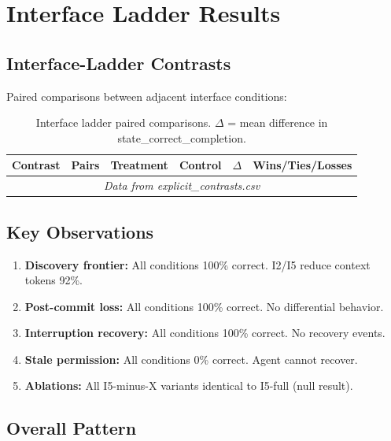 
\section{Interface Ladder Results}

\subsection{Interface-Ladder Contrasts}

Paired comparisons between adjacent interface conditions:

\begin{table}[h]
\centering
\begin{tabular}{lccccc}
\hline
\textbf{Contrast} & \textbf{Pairs} & \textbf{Treatment} & \textbf{Control} & \textbf{$\Delta$} & \textbf{Wins/Ties/Losses} \\
\hline
\multicolumn{6}{c}{\textit{Data from explicit\_contrasts.csv}} \\
\end{tabular}
\caption{Interface ladder paired comparisons. $\Delta$ = mean difference in state\_correct\_completion.}
\label{tab:interface_ladder}
\end{table}

\subsection{Key Observations}

\begin{enumerate}
    \item \textbf{Discovery frontier:} All conditions 100\% correct. I2/I5 reduce context tokens 92\%.
    \item \textbf{Post-commit loss:} All conditions 100\% correct. No differential behavior.
    \item \textbf{Interruption recovery:} All conditions 100\% correct. No recovery events.
    \item \textbf{Stale permission:} All conditions 0\% correct. Agent cannot recover.
    \item \textbf{Ablations:} All I5-minus-X variants identical to I5-full (null result).
\end{enumerate}

\subsection{Overall Pattern}

